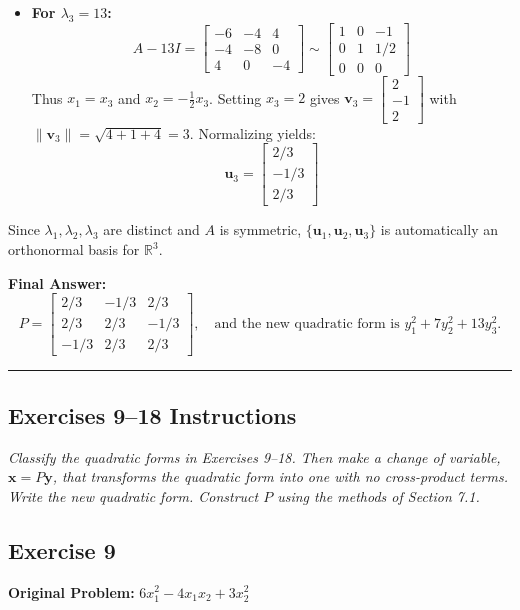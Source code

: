 \documentclass[11pt, letterpaper]{article}
\theoremstyle{definition}
\theoremstyle{remark}
\begin{document}
\begin{itemize}
\[    \]
    \item \textbf{For $\lambda_3 = 13$:}
    \[
    A - 13I = \begin{bmatrix} -6 & -4 & 4 \\ -4 & -8 & 0 \\ 4 & 0 & -4 \end{bmatrix} \sim \begin{bmatrix} 1 & 0 & -1 \\ 0 & 1 & 1/2 \\ 0 & 0 & 0 \end{bmatrix}
    \]
    Thus $x_1 = x_3$ and $x_2 = -\frac{1}{2}x_3$. Setting $x_3 = 2$ gives $\mathbf{v}_3 = \begin{bmatrix} 2 \\ -1 \\ 2 \end{bmatrix}$ with $\|\mathbf{v}_3\| = \sqrt{4 + 1 + 4} = 3$. Normalizing yields:
    \[
    \mathbf{u}_3 = \begin{bmatrix} 2/3 \\ -1/3 \\ 2/3 \end{bmatrix}
    \]
\end{itemize}
Since $\lambda_1, \lambda_2, \lambda_3$ are distinct and $A$ is symmetric, $\{\mathbf{u}_1, \mathbf{u}_2, \mathbf{u}_3\}$ is automatically an orthonormal basis for $\mathbb{R}^3$.

\textbf{Final Answer:}
\[
P = \begin{bmatrix} 2/3 & -1/3 & 2/3 \\ 2/3 & 2/3 & -1/3 \\ -1/3 & 2/3 & 2/3 \end{bmatrix}, \quad \text{and the new quadratic form is } y_1^2 + 7y_2^2 + 13y_3^2.
\]

\medskip\hrule\medskip

\subsection*{Exercises 9--18 Instructions}
\textit{Classify the quadratic forms in Exercises 9--18. Then make a change of variable, $\mathbf{x} = P\mathbf{y}$, that transforms the quadratic form into one with no cross-product terms. Write the new quadratic form. Construct $P$ using the methods of Section 7.1.}

\subsection*{Exercise 9}
\textbf{Original Problem:} $6x_1^2 - 4x_1x_2 + 3x_2^2$
\end{document}

